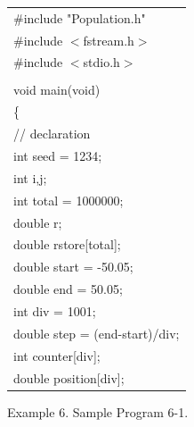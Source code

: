 {\footnotesize
\begin{center}
\begin{tabular}{|l|}\hline
\#include "Population.h"\\
\#include $<$fstream.h$>$\\
\#include $<$stdio.h$>$\\
\hspace*{\textwidth}\\
void main(void)\\
\{\\
\hspace*{10mm}// declaration\\
\hspace*{10mm}int seed      = 1234;\\
\hspace*{10mm}int i,j;\\
\hspace*{10mm}int total     = 1000000;\\
\hspace*{10mm}double r;\\
\hspace*{10mm}double rstore[total];\\
\hspace*{10mm}double start  = -50.05;\\
\hspace*{10mm}double end    =  50.05;\\
\hspace*{10mm}int div       =   1001;\\
\hspace*{10mm}double step   = (end-start)/div;\\
\hspace*{10mm}int counter[div];\\
\hspace*{10mm}double position[div];\\\hline
\end{tabular}
\vspace*{5mm}

{\small
Example 6. Sample Program 6-1.
}
\end{center}
}

\clearpage

